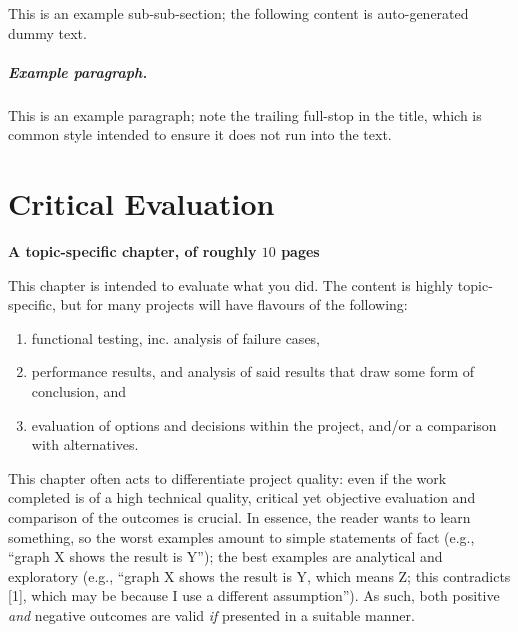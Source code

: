 \documentclass[ %
                    author={Sam Phippen},
                supervisor={Dr. Rafal Bogacz},
                     title={Real time voice activity detectors in noisy personal computing environments},
                  subtitle={},
                    degree={MEng},
                      year={2012} ]{thesis}
\begin{document}
This is an example sub-sub-section;
the following content is auto-generated dummy text.
\lipsum

\paragraph{Example paragraph.}

This is an example paragraph; note the trailing full-stop in the title,
which is common style intended to ensure it does not run into the text.


\chapter{Critical Evaluation}
\label{chap:evaluation}

{\bf A topic-specific chapter, of roughly $10$ pages} 
\vspace{1cm} 

\noindent
This chapter is intended to evaluate what you did.  The content is highly 
topic-specific, but for many projects will have flavours of the following:

\begin{enumerate}
\item functional testing, inc. analysis of failure cases,
\item performance results, and analysis of said results that draw some 
      form of conclusion,
      and
\item evaluation of options and decisions within the project, and/or a
      comparison with alternatives.
\end{enumerate}

\noindent
This chapter often acts to differentiate project quality: even if the work
completed is of a high technical quality, critical yet objective evaluation 
and comparison of the outcomes is crucial.  In essence, the reader wants to
learn something, so the worst examples amount to simple statements of fact 
(e.g., ``graph X shows the result is Y''); the best examples are analytical 
and exploratory (e.g., ``graph X shows the result is Y, which means Z; this 
contradicts [1], which may be because I use a different assumption'').  As 
such, both positive {\em and} negative outcomes are valid {\em if} presented 
in a suitable manner.

\end{document}
